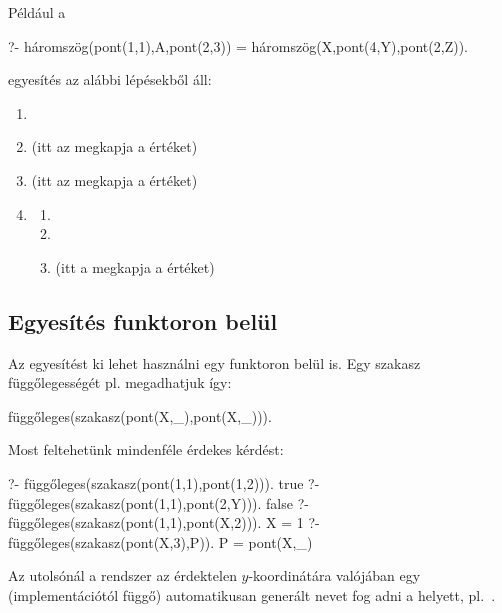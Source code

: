 Például a
\begin{query}
?- háromszög(pont(1,1),A,pont(2,3)) =
   háromszög(X,pont(4,Y),pont(2,Z)).
\end{query}
egyesítés az alábbi lépésekből áll:
\begin{enumerate}
\item {}
\item {}
  (itt az  megkapja a  értéket)
\item {}
  (itt az  megkapja a  értéket)
\item {}
  \begin{enumerate}
    \item {}
    \item {}
    \item {}
      (itt a  megkapja a  értéket)
  \end{enumerate}
\end{enumerate}

\subsection*{Egyesítés funktoron belül}
	
Az egyesítést ki lehet használni egy funktoron belül
is. Egy szakasz függőlegességét pl. megadhatjuk így:
\begin{query}
függőleges(szakasz(pont(X,_),pont(X,_))).
\end{query}

Most feltehetünk mindenféle érdekes kérdést:
\begin{query}
?- függőleges(szakasz(pont(1,1),pont(1,2))).
true
?- függőleges(szakasz(pont(1,1),pont(2,Y))).
false
?- függőleges(szakasz(pont(1,1),pont(X,2))).
X = 1
?- függőleges(szakasz(pont(X,3),P)).
P = pont(X,_)
\end{query}
Az utolsónál a rendszer az érdektelen
$y$-koordinátára valójában egy (implementációtól
függő) automatikusan generált nevet fog adni a
\pr{\_} helyett, pl.~.

